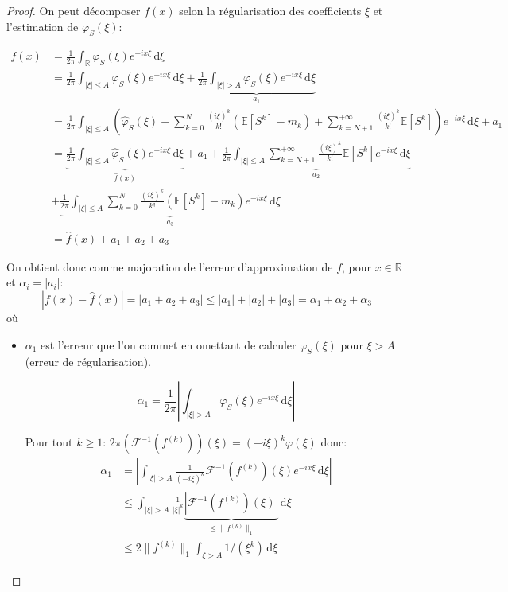 \documentclass[12pt]{article}
\newcommand{\pth}[1]{\left(#1\right)}
\newcommand{\cro}[1]{\left[#1\right]}
\newcommand{\abs}[1]{\left|#1\right|}
\newcommand{\dabs}[1]{\|#1\|}
\newcommand{\de}{\,\mathrm{d}}
\newcommand{\Er}{\mathbb{R}}
\newcommand{\Esp}[1]{\mathbb{E}\cro{#1}}
\begin{document}
\begin{proof}
On peut décomposer $f(x)$ selon la régularisation des coefficients $\xi$ et l'estimation de $\varphi_S(\xi)$:

\begin{align*}
f(x) &= \frac1{2\pi} \int_{\mathbb R}\varphi_S(\xi)e^{-ix\xi}\de\xi\\
&= \frac1{2\pi} \int_{\abs{\xi}\leqslant A}\varphi_S(\xi)e^{-ix\xi}\de\xi + \underbrace{\frac1{2\pi} \int_{\abs{\xi} > A}\varphi_S(\xi)e^{-ix\xi}\de\xi}_{a_1}\\
&= \frac1{2\pi} \int_{\abs{\xi}\leqslant A}\pth{\hat{\varphi}_S(\xi)+\sum_{k=0}^{N}\frac{(i\xi)^k}{k!}\pth{\Esp{S^k}-m_k}+\sum_{k=N+1}^{+\infty}\frac{(i\xi)^k}{k!}\Esp{S^k}}e^{-ix\xi}\de\xi + a_1\\
&= \underbrace{\frac1{2\pi} \int_{\abs{\xi}\leqslant A}\hat{\varphi}_S(\xi)e^{-ix\xi}\de\xi}_{\hat f(x)}
+ a_1
+ \underbrace{\frac1{2\pi}\int_{\abs{\xi}\leqslant A}\sum_{k=N+1}^{+\infty}\frac{(i\xi)^k}{k!}\Esp{S^k}e^{-ix\xi}\de\xi}_{a_2}\\
&+ \underbrace{\frac1{2\pi}\int_{\abs{\xi}\leqslant A}\sum_{k=0}^{N}\frac{(i\xi)^k}{k!}\pth{\Esp{S^k}-m_k}e^{-ix\xi}\de\xi}_{a_3}\\
&= \hat{f}(x) + a_1 + a_2 + a_3
\end{align*}

On obtient donc comme majoration de l'erreur d'approximation de $f$, pour $x\in\Er$ et $\alpha_i = |a_i|$:
\[\abs{f(x)-\hat{f}(x)} = \abs{a_1 + a_2 + a_3}\leqslant |a_1| + |a_2| + |a_3| = \alpha_1+\alpha_2+\alpha_3\]
où

\begin{itemize}
\item $\alpha_1$ est l'erreur que l'on commet en omettant de calculer $\varphi_S(\xi)$ pour $\xi>A$ (erreur de régularisation). %

\[\alpha_1 = \frac1{2\pi} \abs{\int_{\abs{\xi} > A}\varphi_S(\xi)e^{-ix\xi}\de\xi}\]

  Pour tout $k\geqslant 1$: $2\pi\pth{\mathcal{F}^{-1}(f^{(k)})}(\xi)=(-i\xi)^k\varphi(\xi)$ donc:
  \begin{align*}
    \alpha_1&=\abs{\int_{\abs{\xi}>A}\frac{1}{(-i\xi)^k}\mathcal{F}^{-1}(f^{(k)})(\xi)e^{-ix\xi}\de\xi}\\
    &\leqslant \int_{\abs{\xi}>A}\frac{1}{\abs{\xi}^k}\underbrace{\abs{\mathcal{F}^{-1}(f^{(k)})(\xi)}}_{\leqslant\dabs{f^{(k)}}_{1}}\de\xi\\
    &\leqslant 2\dabs{f^{(k)}}_{1}\int_{\xi>A}1/(\xi^k)\de\xi
  \end{align*}


\end{itemize}
\end{proof}
\end{document}
